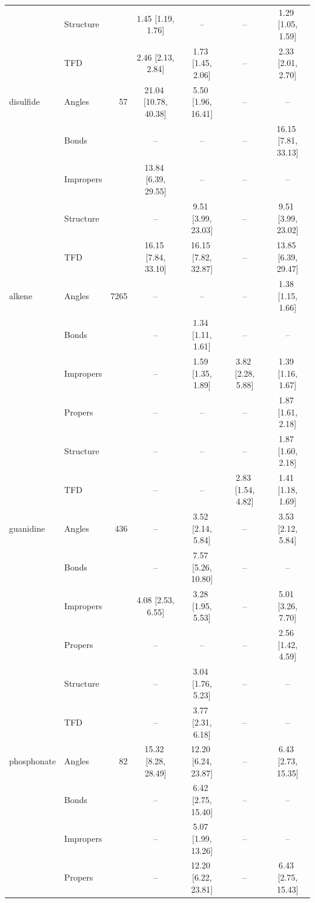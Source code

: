 \begin{longtable}[c]{ ll | r | c c c c}
     & Structure &  & 1.45\,\,[1.19, 1.76] & -- & -- & 1.29\,\,[1.05, 1.59] \\
     & TFD &  & 2.46\,\,[2.13, 2.84] & 1.73\,\,[1.45, 2.06] & -- & 2.33\,\,[2.01, 2.70] \\
    \hline
    disulfide & Angles & 57 & 21.04\,\,[10.78, 40.38] & 5.50\,\,[1.96, 16.41] & -- & -- \\
     & Bonds &  & -- & -- & -- & 16.15\,\,[7.81, 33.13] \\
     & Impropers &  & 13.84\,\,[6.39, 29.55] & -- & -- & -- \\
     & Structure &  & -- & 9.51\,\,[3.99, 23.03] & -- & 9.51\,\,[3.99, 23.02] \\
     & TFD &  & 16.15\,\,[7.84, 33.10] & 16.15\,\,[7.82, 32.87] & -- & 13.85\,\,[6.39, 29.47] \\
    \hline
    alkene & Angles & 7265 & -- & -- & -- & 1.38\,\,[1.15, 1.66] \\
     & Bonds &  & -- & 1.34\,\,[1.11, 1.61] & -- & -- \\
     & Impropers &  & -- & 1.59\,\,[1.35, 1.89] & 3.82\,\,[2.28, 5.88] & 1.39\,\,[1.16, 1.67] \\
     & Propers &  & -- & -- & -- & 1.87\,\,[1.61, 2.18] \\
     & Structure &  & -- & -- & -- & 1.87\,\,[1.60, 2.18] \\
     & TFD &  & -- & -- & 2.83\,\,[1.54, 4.82] & 1.41\,\,[1.18, 1.69] \\
    \hline
    guanidine & Angles & 436 & -- & 3.52\,\,[2.14, 5.84] & -- & 3.53\,\,[2.12, 5.84] \\
     & Bonds &  & -- & 7.57\,\,[5.26, 10.80] & -- & -- \\
     & Impropers &  & 4.08\,\,[2.53, 6.55] & 3.28\,\,[1.95, 5.53] & -- & 5.01\,\,[3.26, 7.70] \\
     & Propers &  & -- & -- & -- & 2.56\,\,[1.42, 4.59] \\
     & Structure &  & -- & 3.04\,\,[1.76, 5.23] & -- & -- \\
     & TFD &  & -- & 3.77\,\,[2.31, 6.18] & -- & -- \\
    \hline
    phosphonate & Angles & 82 & 15.32\,\,[8.28, 28.49] & 12.20\,\,[6.24, 23.87] & -- & 6.43\,\,[2.73, 15.35] \\
     & Bonds &  & -- & 6.42\,\,[2.75, 15.40] & -- & -- \\
     & Impropers &  & -- & 5.07\,\,[1.99, 13.26] & -- & -- \\
     & Propers &  & -- & 12.20\,\,[6.22, 23.81] & -- & 6.43\,\,[2.75, 15.43] \\

\end{longtable}

